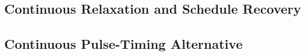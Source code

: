 \subsection{Continuous Relaxation and Schedule Recovery}

\subsection{Continuous Pulse-Timing Alternative}
